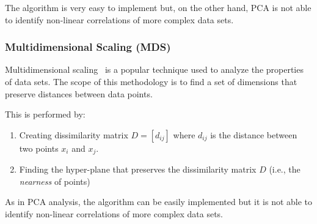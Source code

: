 The algorithm is very easy to implement but, on the other hand, PCA is not able to identify non-linear correlations of more complex data sets.


\subsubsection{Multidimensional Scaling (MDS)}
\label{mds}

Multidimensional scaling~\cite{MDS} is a popular technique used to analyze the properties of data sets. The scope of this methodology is to find a set of dimensions that preserve distances between data points.

This is performed by:
\begin{enumerate}
  \item Creating dissimilarity matrix $D=[d_{ij}]$ where $d_{ij}$ is the distance between two points $x_i$ and $x_j$.
  \item Finding the hyper-plane that preserves the dissimilarity matrix $D$ (i.e., the \emph{nearness} of points)
\end{enumerate}

As in PCA analysis, the algorithm can be easily implemented but it is not able to identify non-linear correlations of more complex data sets.

